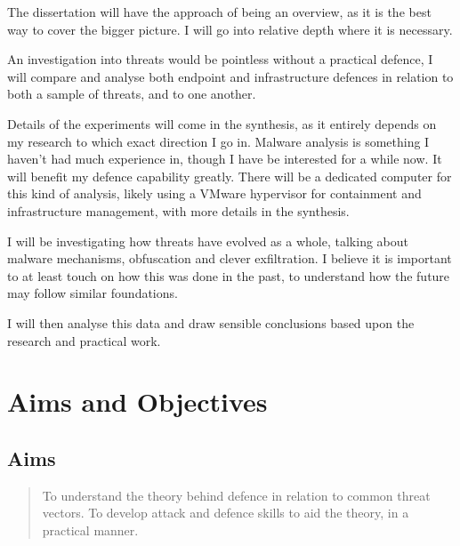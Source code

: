 The dissertation will have the approach of being an overview, as it is the best way to cover the bigger picture. 
I will go into relative depth where it is necessary. 

An investigation into threats would be pointless without a practical defence, 
I will compare and analyse both endpoint and infrastructure defences in relation to both a sample of threats, and to one another. 

Details of the experiments will come in the synthesis, as it entirely depends on my research to which exact direction I go in. 
Malware analysis is something I haven't had much experience in, though I have be interested for a while now. It will benefit my defence capability greatly.
There will be a dedicated computer for this kind of analysis, likely using a VMware hypervisor for containment and infrastructure management, with more details in the synthesis.

I will be investigating how threats have evolved as a whole, talking about malware mechanisms, obfuscation and clever exfiltration. 
I believe it is important to at least touch on how this was done in the past, to understand how the future may follow similar foundations. 

I will then analyse this data and draw sensible conclusions based upon the research and practical work.
\section{Aims and Objectives}
\subsection{Aims}
\begin{quote}
	To understand the theory behind defence in relation to common threat vectors.
	To develop attack and defence skills to aid the theory, in a practical manner.
\end{quote}

